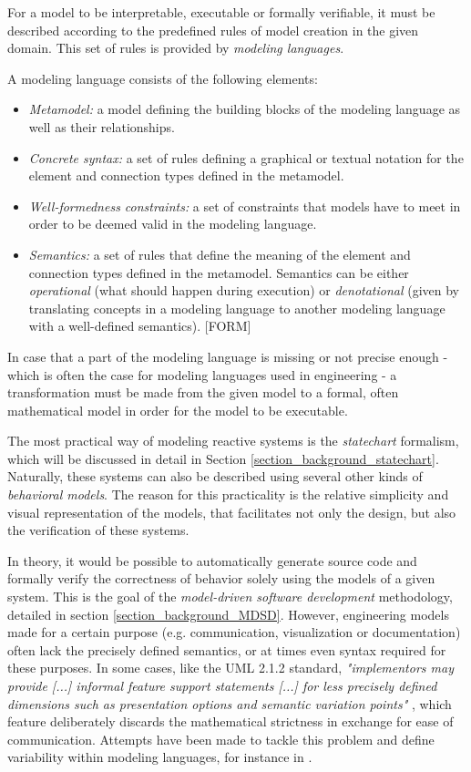 For a model to be interpretable, executable or formally verifiable, it must be described according to the predefined rules of model creation in the given domain. This set of rules is provided by \textit{modeling languages}.
\begin{definition}
	A modeling language consists of the following elements:
	\begin{itemize}
		\item \emph{Metamodel:} a model defining the building blocks of the modeling language as well
		as their relationships.
		\item \emph{Concrete syntax:} a set of rules defining a graphical or textual notation for the
		element and connection types defined in the metamodel.
		\item \emph{Well-formedness constraints:} a set of constraints that models have to meet in order
		to be deemed valid in the modeling language.
		\item \emph{Semantics:} a set of rules that define the meaning of the element and connection
		types defined in the metamodel. Semantics can be either \textit{operational} (what should happen during execution) or \textit{denotational} (given by translating concepts in a modeling language to another modeling language with a well-defined semantics). [FORM]
	\end{itemize}
\end{definition}
In case that a part of the modeling language is missing or not precise enough - which is often the case for modeling languages used in engineering - a transformation must be made from the given model to a formal, often mathematical model in order for the model to be executable.

The most practical way of modeling reactive systems is the \textit{statechart} formalism, which will be discussed in detail in Section \ref{section_background_statechart}. Naturally, these systems can also be described using several other kinds of \textit{behavioral models}. The reason for this practicality is the relative simplicity and visual representation of the models, that facilitates not only the design, but also the verification of these systems. 

In theory, it would be possible to automatically generate source code and formally verify the correctness of behavior solely using the models of a given system. This is the goal of the \textit{model-driven software development} methodology, detailed in section \ref{section_background_MDSD}. However, engineering models made for a certain purpose (e.g. communication, visualization or documentation) often lack the precisely defined semantics, or at times even syntax required for these purposes. In some cases, like the UML 2.1.2 standard, \textit{"implementors may provide [...] informal feature support statements [...] for less precisely defined dimensions such as presentation options and semantic variation points"} \cite{UMLStandard212}, which feature deliberately discards the mathematical strictness in exchange for ease of communication. Attempts have been made to tackle this problem and define variability within modeling languages, for instance in \cite{VariabilityInModelingLanguages}.


